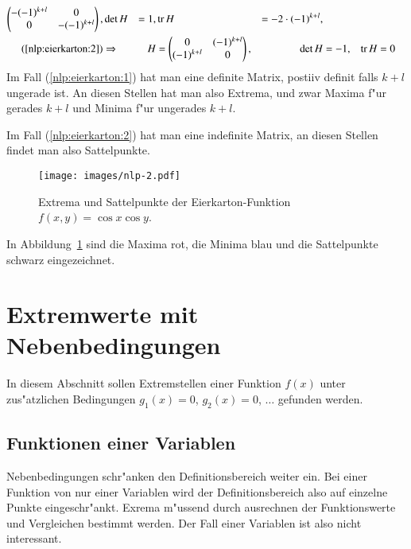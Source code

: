 \begin{beispiel}
\begin{align*}
\begin{pmatrix}
-(-1)^{k+l}&0\\
0&-(-1)^{k+l}
\end{pmatrix},
&
\det H&=1,&
\operatorname{tr} H&= -2\cdot (-1)^{k+l},
\\
(\ref{nlp:eierkarton:2})
&\Rightarrow
&
H&=\begin{pmatrix}
0&(-1)^{k+l}\\
(-1)^{k+l}&0
\end{pmatrix},
&
\det H&=-1,
&
\operatorname{tr}H&=0
\end{align*}
Im Fall (\ref{nlp:eierkarton:1}) hat man eine definite Matrix,
postiiv definit falls $k+l$ ungerade ist. An diesen Stellen hat man
also Extrema, und zwar Maxima f"ur gerades $k+l$ und Minima f"ur ungerades
$k+l$.

Im Fall (\ref{nlp:eierkarton:2}) hat man eine indefinite Matrix,
an diesen Stellen findet man also Sattelpunkte.

\begin{figure}
\begin{center}
\texttt{[image: images/nlp-2.pdf]}
\end{center}
\caption{Extrema und Sattelpunkte der Eierkarton-Funktion $f(x,y)=\cos x\cos y$.
\label{nlp:eggcrate}}
\end{figure}
In Abbildung~\ref{nlp:eggcrate} sind die Maxima rot, die Minima blau
und die Sattelpunkte schwarz eingezeichnet.
\end{beispiel}

\section{Extremwerte mit Nebenbedingungen}
In diesem Abschnitt sollen Extremstellen einer Funktion $f(x)$ 
unter zus"atzlichen Bedingungen $g_1(x)=0$, $g_2(x)=0$, $\dots$
gefunden werden.
\subsection{Funktionen einer Variablen\label{nlp:nebenbedingungen:einevariable}}
Nebenbedingungen schr"anken den Definitionsbereich weiter ein.
Bei einer Funktion von nur einer Variablen wird der Definitionsbereich
also auf einzelne Punkte eingeschr"ankt. Exrema m"ussend durch ausrechnen
der Funktionswerte und Vergleichen bestimmt werden. 
Der Fall einer Variablen ist also nicht interessant.

